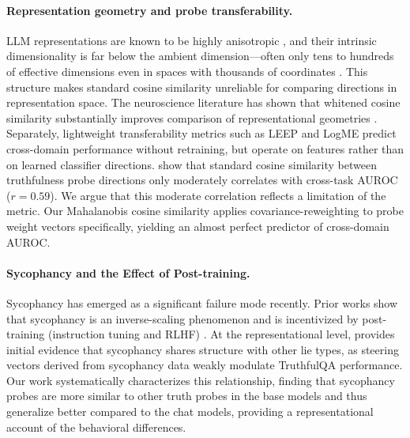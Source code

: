 \documentclass{article}
\theoremstyle{plain}
\theoremstyle{definition}
\theoremstyle{remark}
\begin{document}
\paragraph{Representation geometry and probe transferability.}
LLM representations are known to be highly anisotropic \cite{ethayarajh2019contextual}, and their intrinsic dimensionality is far below the ambient dimension—often only tens to hundreds of effective dimensions even in spaces with thousands of coordinates \cite{aghajanyan2021intrinsic, valeriani2023geometry}. This structure makes standard cosine similarity unreliable for comparing directions in representation space. The neuroscience literature has shown that whitened cosine similarity substantially improves comparison of representational geometries \cite{diedrichsen2021comparing}. Separately, lightweight transferability metrics such as LEEP \cite{nguyen2020leep} and LogME \cite{you2021logme} predict cross-domain performance without retraining, but operate on features rather than on learned classifier directions. \citet{azizian2025geometries} show that standard cosine similarity between truthfulness probe directions only moderately correlates with cross-task AUROC ($r{=}0.59$). We argue that this moderate correlation reflects a limitation of the metric. Our Mahalanobis cosine similarity applies covariance-reweighting to probe weight vectors specifically, yielding an almost perfect predictor of cross-domain AUROC.

\paragraph{Sycophancy and the Effect of Post-training.} 
Sycophancy has emerged as a significant failure mode recently. Prior works show that sycophancy is an inverse-scaling phenomenon and is incentivized by post-training (instruction tuning and RLHF) \cite{wei2023simple, perez2023discovering, sharma2024towards}. At the representational level, \citet{rimsky2024steering} provides initial evidence that sycophancy shares structure with other lie types, as steering vectors derived from sycophancy data weakly modulate TruthfulQA performance. Our work systematically characterizes this relationship, finding that sycophancy probes are more similar to other truth probes in the base models and thus generalize better compared to the chat models, providing a representational account of the behavioral differences. 
\end{document}
